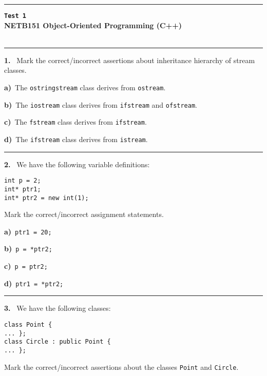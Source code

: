 \newpage\thispagestyle{empty}\par 
\hrule 
\begin{center}
{\bf\large {}}\hfill {\bf\large\verb|Test 1|}
 \hfill{\bf\large {}}\\ 
{\bf\large NETB151 Object-Oriented Programming (C++)}\\[4pt]
{\bf \large {}}\\ 
\end{center}\par
 \vspace{-4mm}
\begin{multicols}{2}
\par\smallskip\hrule\par\medskip

{\bf 1. }\ Mark the correct/incorrect assertions about inheritance
hierarchy of stream classes.

{\bf a)}\ The \verb|ostringstream| class derives from \verb|ostream|.

{\bf b)}\ The \verb|iostream| class derives from \verb|ifstream| and \verb|ofstream|.

{\bf c)}\ The \verb|fstream| class derives from \verb|ifstream|.

{\bf d)}\ The \verb|ifstream| class derives from \verb|istream|.

\par\smallskip\hrule\par\medskip

{\bf 2. }\ We have the following variable definitions:
 \vspace{-3mm}\begin{verbatim}
int p = 2;
int* ptr1;
int* ptr2 = new int(1);
 \end{verbatim}\vspace{-6mm}
Mark the correct/incorrect assignment statements.

{\bf a)}\ \verb|ptr1 = 20;|

{\bf b)}\ \verb|p = *ptr2;|

{\bf c)}\ \verb|p = ptr2;|

{\bf d)}\ \verb|ptr1 = *ptr2;|

\par\smallskip\hrule\par\medskip

{\bf 3. }\ We have the following classes:
 \vspace{-3mm}\begin{verbatim}
class Point {
... };
class Circle : public Point {
... };
 \end{verbatim}\vspace{-6mm}
Mark the correct/incorrect assertions about the classes
\verb|Point| and \verb|Circle|.


\end{multicols}
